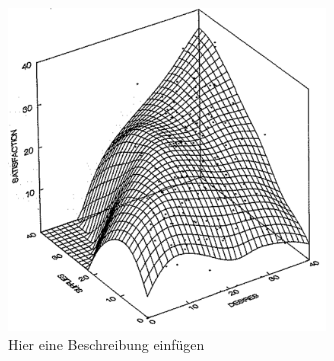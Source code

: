 \begin{figure}[h]
	\centering
	\includegraphics[width=0.75\textwidth]{gfx/drei_d_modell.png}
	\caption{Hier eine Beschreibung einfügen \cite[S. 57]{edwards:1991}}
	\label{fig:personEnvironmentFit:wichtigkeiten:abb2}
\end{figure}\\


\newpage
